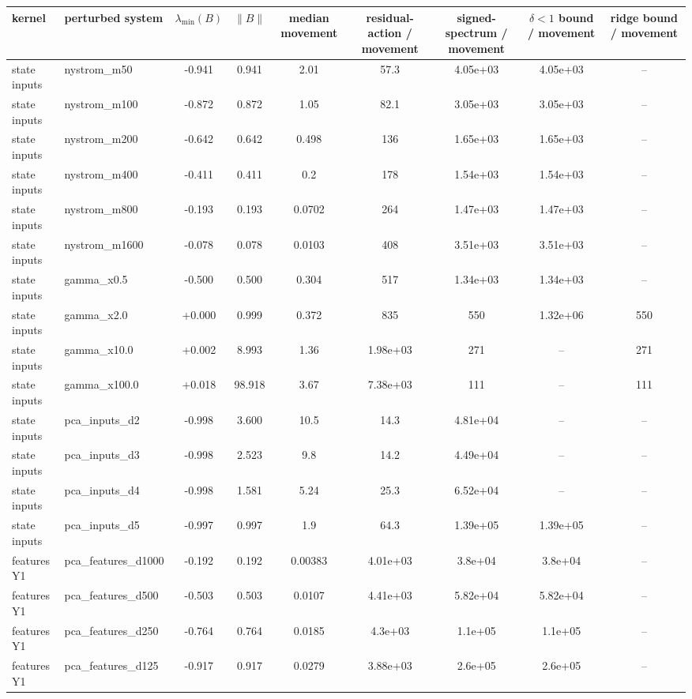 \begin{tabular}{llccccccc}
\toprule
kernel & perturbed system & $\lambda_{\min}(B)$ & $\|B\|$ & median movement & residual-action / movement & signed-spectrum / movement & $\delta<1$ bound / movement & ridge bound / movement \\
\midrule
state inputs & nystrom\_m50 & -0.941 & 0.941 & 2.01 & 57.3 & 4.05e+03 & 4.05e+03 & -- \\
state inputs & nystrom\_m100 & -0.872 & 0.872 & 1.05 & 82.1 & 3.05e+03 & 3.05e+03 & -- \\
state inputs & nystrom\_m200 & -0.642 & 0.642 & 0.498 & 136 & 1.65e+03 & 1.65e+03 & -- \\
state inputs & nystrom\_m400 & -0.411 & 0.411 & 0.2 & 178 & 1.54e+03 & 1.54e+03 & -- \\
state inputs & nystrom\_m800 & -0.193 & 0.193 & 0.0702 & 264 & 1.47e+03 & 1.47e+03 & -- \\
state inputs & nystrom\_m1600 & -0.078 & 0.078 & 0.0103 & 408 & 3.51e+03 & 3.51e+03 & -- \\
state inputs & gamma\_x0.5 & -0.500 & 0.500 & 0.304 & 517 & 1.34e+03 & 1.34e+03 & -- \\
state inputs & gamma\_x2.0 & +0.000 & 0.999 & 0.372 & 835 & 550 & 1.32e+06 & 550 \\
state inputs & gamma\_x10.0 & +0.002 & 8.993 & 1.36 & 1.98e+03 & 271 & -- & 271 \\
state inputs & gamma\_x100.0 & +0.018 & 98.918 & 3.67 & 7.38e+03 & 111 & -- & 111 \\
state inputs & pca\_inputs\_d2 & -0.998 & 3.600 & 10.5 & 14.3 & 4.81e+04 & -- & -- \\
state inputs & pca\_inputs\_d3 & -0.998 & 2.523 & 9.8 & 14.2 & 4.49e+04 & -- & -- \\
state inputs & pca\_inputs\_d4 & -0.998 & 1.581 & 5.24 & 25.3 & 6.52e+04 & -- & -- \\
state inputs & pca\_inputs\_d5 & -0.997 & 0.997 & 1.9 & 64.3 & 1.39e+05 & 1.39e+05 & -- \\
features Y1 & pca\_features\_d1000 & -0.192 & 0.192 & 0.00383 & 4.01e+03 & 3.8e+04 & 3.8e+04 & -- \\
features Y1 & pca\_features\_d500 & -0.503 & 0.503 & 0.0107 & 4.41e+03 & 5.82e+04 & 5.82e+04 & -- \\
features Y1 & pca\_features\_d250 & -0.764 & 0.764 & 0.0185 & 4.3e+03 & 1.1e+05 & 1.1e+05 & -- \\
features Y1 & pca\_features\_d125 & -0.917 & 0.917 & 0.0279 & 3.88e+03 & 2.6e+05 & 2.6e+05 & -- \\

\end{tabular}
